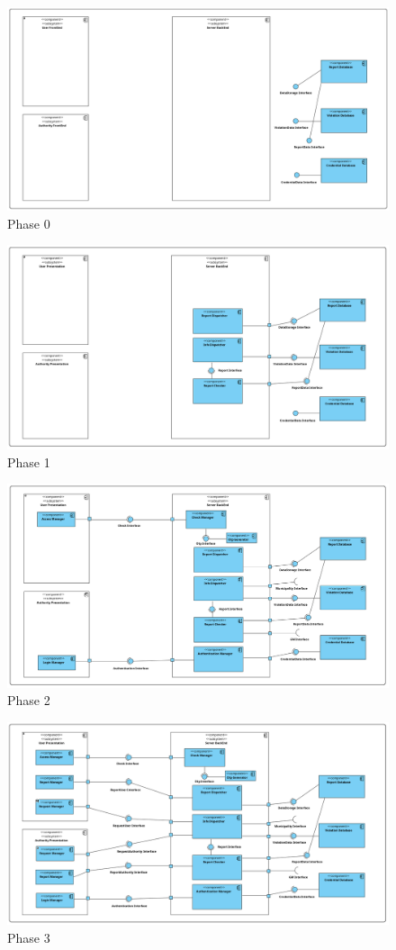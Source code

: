 \begin{figure}[H]
	\includegraphics[width=\textwidth]{Images/ComponentView0.png}
	\caption{\label{fig:ComponentView0}Phase 0}
\end{figure}
\begin{figure}[H]
	\includegraphics[width=\textwidth]{Images/ComponentView1.png}
	\caption{\label{fig:ComponentView1}Phase 1}
\end{figure}
\begin{figure}[H]
	\includegraphics[width=\textwidth]{Images/ComponentView2.png}
	\caption{\label{fig:ComponentView2}Phase 2}
\end{figure}
\begin{figure}[H]
	\includegraphics[width=\textwidth]{Images/ComponentView3.png}
	\caption{\label{fig:ComponentView3}Phase 3}
\end{figure}